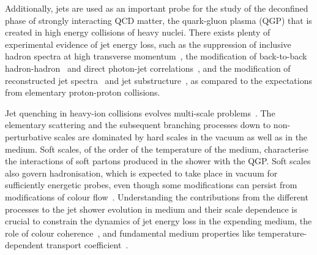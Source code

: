 Additionally, jets are used as an important probe for the study of the deconfined phase of strongly interacting QCD matter, the quark-gluon plasma (QGP) that is created in high energy collisions of heavy nuclei.
There exists plenty of experimental evidence of jet energy loss, such as the suppression of inclusive hadron spectra at high transverse momentum~\cite{Adcox:2001jp,Adams:2003im,Arsene:2003yk,Khachatryan:2016odn,Acharya:2018qsh}, the modification of back-to-back hadron-hadron~\cite{Adare:2007vu,Aamodt:2011vg} and direct photon-jet correlations~\cite{Adare:2012qi}, and the modification of reconstructed jet spectra~\cite{Adam:2015ewa} and jet substructure~\cite{Sirunyan:2018qec,Chatrchyan:2014ava,Acharya:2018uvf}, as compared to the expectations from elementary proton-proton collisions.

Jet quenching in heavy-ion collisions evolves multi-scale problems~\cite{Kurkela:2014tla,Tachibana:2018yae}. The elementary scattering and the subsequent branching processes down to non-perturbative scales are dominated by hard scales in the vacuum as well as in the medium. Soft scales, of the order of the temperature of the medium, characterise the interactions of soft partons produced in the shower with the QGP. Soft scales also govern hadronisation, which is expected to take place in vacuum for sufficiently energetic probes, even though some modifications can persist from modifications of colour flow~\cite{Aurenche:2011rd,Beraudo:2011bh,Beraudo:2012bq}. Understanding the contributions from the different processes to the jet shower evolution in medium and their scale dependence is crucial to constrain the dynamics of jet energy loss in the expending medium, the role of colour coherence~\cite{CasalderreySolana:2012ef}, and fundamental medium properties like temperature-dependent transport coefficient~\cite{DEramo:2012uzl,Ayala:2016pvm}.


